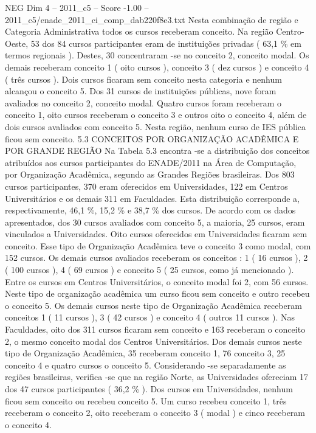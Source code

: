 \begin{textsample}{NEG Dim 4 – 2011\_c5 – Score -1.00 – 2011\_c5/enade\_2011\_ci\_comp\_dab220f8e3.txt}
Nesta combinação de região e Categoria Administrativa todos os cursos receberam conceito.
Na região Centro-Oeste, 53 dos 84 cursos participantes eram de instituições privadas ( 63,1 \% em termos regionais ).
Destes, 30 concentraram -se no conceito 2, conceito modal.
Os demais receberam conceito 1 ( oito cursos ), conceito 3 ( dez cursos ) e conceito 4 ( três cursos ).
Dois cursos ficaram sem conceito nesta categoria e nenhum alcançou o conceito 5.
Dos 31 cursos de instituições públicas, nove foram avaliados no conceito 2, conceito modal.
Quatro cursos foram receberam o conceito 1, oito cursos receberam o conceito 3 e outros oito o conceito 4, além de dois cursos avaliados com conceito 5.
Nesta região, nenhum curso de IES pública ficou sem conceito. 5.3 CONCEITOS POR ORGANIZAÇÃO ACADÊMICA E POR GRANDE REGIÃO Na Tabela 5.3 encontra -se a distribuição dos conceitos atribuídos aos cursos participantes do ENADE/2011 na Área de Computação, por Organização Acadêmica, segundo as Grandes Regiões brasileiras.
Dos 803 cursos participantes, 370 eram oferecidos em Universidades, 122 em Centros Universitários e os demais 311 em Faculdades.
Esta distribuição corresponde a, respectivamente, 46,1 \%, 15,2 \% e 38,7 \% dos cursos.
De acordo com os dados apresentados, dos 30 cursos avaliados com conceito 5, a maioria, 25 cursos, eram vinculados a Universidades.
Oito cursos oferecidos em Universidades ficaram sem conceito.
Esse tipo de Organização Acadêmica teve o conceito 3 como modal, com 152 cursos.
Os demais cursos avaliados receberam os conceitos : 1 ( 16 cursos ), 2 ( 100 cursos ), 4 ( 69 cursos ) e conceito 5 ( 25 cursos, como já mencionado ).
Entre os cursos em Centros Universitários, o conceito modal foi 2, com 56 cursos.
Neste tipo de organização acadêmica um curso ficou sem conceito e outro recebeu o conceito 5.
Os demais cursos neste tipo de Organização Acadêmica receberam conceitos 1 ( 11 cursos ), 3 ( 42 cursos ) e conceito 4 ( outros 11 cursos ).
Nas Faculdades, oito dos 311 cursos ficaram sem conceito e 163 receberam o conceito 2, o mesmo conceito modal dos Centros Universitários.
Dos demais cursos neste tipo de Organização Acadêmica, 35 receberam conceito 1, 76 conceito 3, 25 conceito 4 e quatro cursos o conceito 5.
Considerando -se separadamente as regiões brasileiras, verifica -se que na região Norte, as Universidades ofereciam 17 dos 47 cursos participantes ( 36,2 \% ).
Dos cursos em Universidades, nenhum ficou sem conceito ou recebeu conceito 5.
Um curso recebeu conceito 1, três receberam o conceito 2, oito receberam o conceito 3 ( modal ) e cinco receberam o conceito 4.

\end{textsample}
